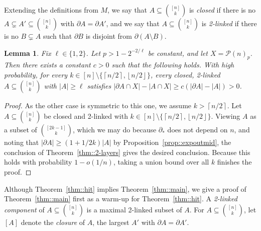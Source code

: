 \documentclass[12pt]{article}
\renewcommand{\P}{\mathcal{P}}
\newcommand{\floor}[1]{\left\lfloor#1\right\rfloor}
\newcommand{\ceil}[1]{\left\lceil#1\right\rceil}
\newtheorem{lemma}[theorem]{Lemma}
\begin{document}
Extending the definitions from $M$, we say that $A \subseteq \binom{[n]}{k}$ is \emph{closed} if there is no $A \subsetneq A' \subseteq \binom{[n]}{k}$ with $\partial A = \partial A'$, and we say that $A \subseteq \binom{[n]}{k}$ is \emph{2-linked} if there is no $B \subsetneq A$ such that $\partial B$ is disjoint from $\partial (A \setminus B)$.
\begin{lemma}\label{lem::2-layers}
Fix $\ell \in \{1,2\}$. Let $p > 1-2^{-2/\ell}$ be constant, and let $X = \P(n)_p$. Then there exists a constant $c>0$ such that the following holds. With high probability, for every $k \in [n] \setminus \{\ceil{n/2},\floor{n/2}\}$, every closed, 2-linked $A \subseteq \binom{[n]}{k}$ with $|A| \geq \ell$ satisfies $|\partial A \cap X| - |A \cap X| \geq c(|\partial A| - |A|) > 0$.
\end{lemma}
\begin{proof}
As the other case is symmetric to this one, we assume $k>\ceil{n/2}$. Let $A \subseteq \binom{[n]}{k}$ be closed and 2-linked with $k \in [n] \setminus \{\ceil{n/2},\floor{n/2}\}$. Viewing $A$ as a subset of $\binom{[2k-1]}{k}$, which we may do because $\partial_*$ does not depend on $n$, and noting that $|\partial A| \geq (1+1/2k)|A|$ by Proposition~\ref{prop::expoutmid}, the conclusion of Theorem~\ref{thm::2-layers} gives the desired conclusion. Because this holds with probability $1-o(1/n)$, taking a union bound over all $k$ finishes the proof.
\end{proof}

Although Theorem~\ref{thm::hit} implies Theorem~\ref{thm::main}, we give a proof of Theorem~\ref{thm::main} first as a warm-up for Theorem~\ref{thm::hit}. A \emph{2-linked component} of $A \subseteq \binom{[n]}{k}$ is a maximal 2-linked subset of $A$. For $A \subseteq \binom{[n]}{k}$, let $[A]$ denote the \emph{closure} of $A$, the largest $A'$ with $\partial A = \partial A'$.
\end{document}
